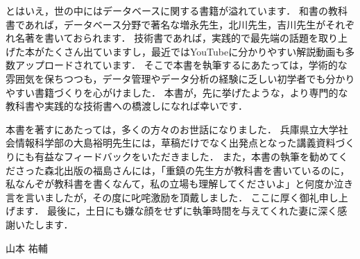 とはいえ，世の中にはデータベースに関する書籍が溢れています．
和書の教科書であれば，データベース分野で著名な増永先生，北川先生，吉川先生がそれぞれ名著を書いておられます．
技術書であれば，実践的で最先端の話題を取り上げた本がたくさん出ていますし，最近ではYouTubeに分かりやすい解説動画も多数アップロードされています．
そこで本書を執筆するにあたっては，学術的な雰囲気を保ちつつも，データ管理やデータ分析の経験に乏しい初学者でも分かりやすい書籍づくりを心がけました．
本書が，先に挙げたような，より専門的な教科書や実践的な技術書への橋渡しになれば幸いです．

本書を著すにあたっては，多くの方々のお世話になりました．
兵庫県立大学社会情報科学部の大島裕明先生には，草稿だけでなく出発点となった講義資料づくりにも有益なフィードバックをいただきました．
また，本書の執筆を勧めてくださった森北出版の福島さんには，「重鎮の先生方が教科書を書いているのに，私なんぞが教科書を書くなんて，私の立場も理解してくださいよ」と何度か泣き言を言いましたが，その度に叱咤激励を頂戴しました．
ここに厚く御礼申し上げます．
最後に，土日にも嫌な顔をせずに執筆時間を与えてくれた妻に深く感謝いたします．

\vspace{2zw}
\begin{flushright}
山本 祐輔
\end{flushright}
